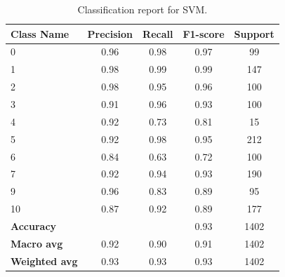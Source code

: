 \begin{table}[h]
    \centering
    \begin{tabular}{lcccc}
        \toprule
        \textbf{Class Name} & \textbf{Precision} & \textbf{Recall} & \textbf{F1-score} & \textbf{Support} \\
        \midrule
        0 & 0.96 & 0.98 & 0.97 & 99 \\
        1 & 0.98 & 0.99 & 0.99 & 147 \\
        2 & 0.98 & 0.95 & 0.96 & 100 \\
        3 & 0.91 & 0.96 & 0.93 & 100 \\
        4 & 0.92 & 0.73 & 0.81 & 15 \\
        5 & 0.92 & 0.98 & 0.95 & 212 \\
        6 & 0.84 & 0.63 & 0.72 & 100 \\
        7 & 0.92 & 0.94 & 0.93 & 190 \\
        9 & 0.96 & 0.83 & 0.89 & 95 \\
        10 & 0.87 & 0.92 & 0.89 & 177 \\
        \midrule
        \textbf{Accuracy} & & & 0.93 & 1402 \\
        \textbf{Macro avg} & 0.92 & 0.90 & 0.91 & 1402 \\
        \textbf{Weighted avg} & 0.93 & 0.93 & 0.93 & 1402 \\
        \bottomrule
    \end{tabular}
    \caption{Classification report for SVM.}
    \label{tab:classification_report_svm}
\end{table}


